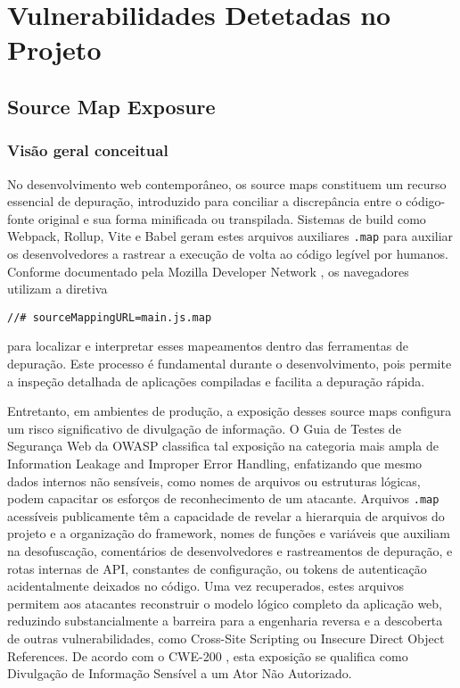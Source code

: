 \section{Vulnerabilidades Detetadas no Projeto}

\subsection{Source Map Exposure}

\subsubsection{Visão geral conceitual}

No desenvolvimento web contemporâneo, os source maps constituem um recurso essencial de depuração, introduzido para conciliar a discrepância entre o código-fonte original e sua forma minificada ou transpilada. Sistemas de build como Webpack, Rollup, Vite e Babel geram estes arquivos auxiliares \texttt{.map} para auxiliar os desenvolvedores a rastrear a execução de volta ao código legível por humanos. Conforme documentado pela Mozilla Developer Network \cite{ref42}, os navegadores utilizam a diretiva  

\begin{verbatim}
//# sourceMappingURL=main.js.map
\end{verbatim}

para localizar e interpretar esses mapeamentos dentro das ferramentas de depuração. Este processo é fundamental durante o desenvolvimento, pois permite a inspeção detalhada de aplicações compiladas e facilita a depuração rápida. 

Entretanto, em ambientes de produção, a exposição desses source maps configura um risco significativo de divulgação de informação. O Guia de Testes de Segurança Web da OWASP \cite{ref2} classifica tal exposição na categoria mais ampla de Information Leakage and Improper Error Handling, enfatizando que mesmo dados internos não sensíveis, como nomes de arquivos ou estruturas lógicas, podem capacitar os esforços de reconhecimento de um atacante. Arquivos \texttt{.map} acessíveis publicamente têm a capacidade de revelar a hierarquia de arquivos do projeto e a organização do framework, nomes de funções e variáveis que auxiliam na desofuscação, comentários de desenvolvedores e rastreamentos de depuração, e rotas internas de API, constantes de configuração, ou tokens de autenticação acidentalmente deixados no código. Uma vez recuperados, estes arquivos permitem aos atacantes reconstruir o modelo lógico completo da aplicação web, reduzindo substancialmente a barreira para a engenharia reversa e a descoberta de outras vulnerabilidades, como Cross-Site Scripting ou Insecure Direct Object References. De acordo com o CWE-200 \cite{ref43}, esta exposição se qualifica como Divulgação de Informação Sensível a um Ator Não Autorizado. 


